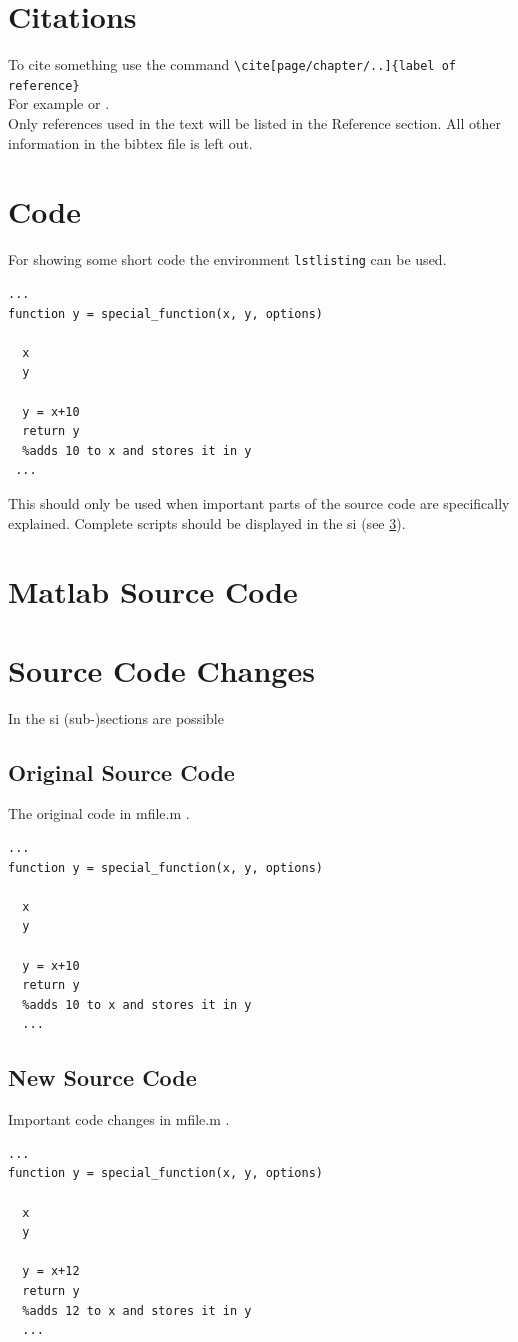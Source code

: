 \documentclass[a4paper, 11pt]{scrreprt}
\begin{document}
\chapter{Citations}
To cite something use the command \verb+\cite[page/chapter/..]{label of reference}+\\
For example \cite[Chapter 1]{Cramer2004} or \cite{Dickson2014}.\\
Only references used in the text will be listed in the Reference section. All other information in the bibtex file is left out.

\chapter{Code}
For showing some short code the environment \verb+lstlisting+ can be used.
\begin{lstlisting}[firstnumber=1550]
...
function y = special_function(x, y, options)

  x
  y
  
  y = x+10
  return y
  %adds 10 to x and stores it in y
 ...
\end{lstlisting}
\noindent
This should only be used when important parts of the source code are specifically explained. Complete scripts should be displayed in the \gls{si} (see \ref{SI:matlabsourcecode}).


\newpage
{}


\newpage
\appendix
{} %
\chapter{Matlab Source Code}\label{SI:matlabsourcecode}


\chapter{Source Code Changes}
In the \gls{si} (sub-)sections are possible
\section{Original Source Code}
The original code in mfile.m .
\begin{lstlisting}[firstnumber=100]
...
function y = special_function(x, y, options)

  x
  y
  
  y = x+10
  return y
  %adds 10 to x and stores it in y
  ...
\end{lstlisting}

\section{New Source Code}
Important code changes in mfile.m .
\begin{lstlisting}[firstnumber=100]
...
function y = special_function(x, y, options)

  x
  y
  
  y = x+12
  return y
  %adds 12 to x and stores it in y
  ...
\end{lstlisting}
\end{document}
